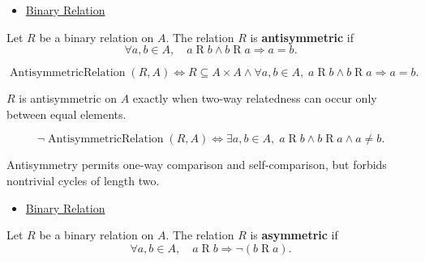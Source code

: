 \begin{dependencies}
\begin{itemize}
  \item \hyperref[def:binary-relation]{Binary Relation}
\end{itemize}
\end{dependencies}

\begin{definition}
\label{def:rel-antisymmetric}
Let $R$ be a binary relation on $A$.
The relation $R$ is \textbf{antisymmetric} if
\[
\forall a,b \in A,\quad
a \mathrel{R} b \land b \mathrel{R} a \Rightarrow a=b.
\]
\end{definition}

\begin{remark*}
\[
\operatorname{AntisymmetricRelation}(R,A)
\Longleftrightarrow
R\subseteq A\times A
\land
\forall a,b\in A,\;
a\mathrel{R}b \land b\mathrel{R}a \Rightarrow a=b.
\]
\end{remark*}

\begin{remark*}
$R$ is antisymmetric on $A$ exactly when two-way relatedness can occur only
between equal elements.
\end{remark*}

\begin{remark*}
\[
\neg\operatorname{AntisymmetricRelation}(R,A)
\Longleftrightarrow
\exists a,b\in A,\;
a\mathrel{R}b \land b\mathrel{R}a \land a\neq b.
\]
\end{remark*}

\begin{remark*}[Interpretation]
Antisymmetry permits one-way comparison and self-comparison, but forbids
nontrivial cycles of length two.
\end{remark*}

\begin{dependencies}
\begin{itemize}
  \item \hyperref[def:binary-relation]{Binary Relation}
\end{itemize}
\end{dependencies}

\begin{definition}
\label{def:rel-asymmetric}
Let $R$ be a binary relation on $A$.
The relation $R$ is \textbf{asymmetric} if
\[
\forall a,b \in A,\quad
a \mathrel{R} b \Rightarrow \lnot(b \mathrel{R} a).
\]
\end{definition}

